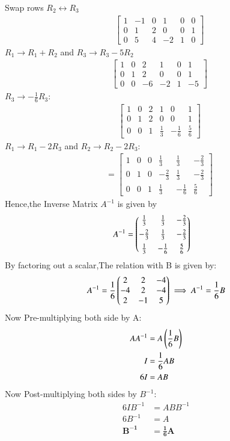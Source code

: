 \documentclass[article]{IEEEtran}
\begin{document}
	Swap rows $R_2 \leftrightarrow R_3$
	\begin{align}
		&\left[ \begin{array}{ccc|ccc} 1 & -1 & 0 & 1 & 0 & 0 \\ 0 & 1 & 2 & 0 & 0 & 1 \\ 0 & 5 & 4 & -2 & 1 & 0 \end{array} \right]
	\end{align}
		$R_1 \to R_1 + R_2$ and $R_3 \to R_3 - 5R_2$
	\begin{align}
&\left[ \begin{array}{ccc|ccc} 1 & 0 & 2 & 1 & 0 & 1 \\ 0 & 1 & 2 & 0 & 0 & 1 \\ 0 & 0 & -6 & -2 & 1 & -5 \end{array} \right]
	\end{align}
 $R_3 \to -\frac{1}{6}R_3$:
	\begin{align}
		&\left[ \begin{array}{ccc|ccc} 1 & 0 & 2 & 1 & 0 & 1 \\ 0 & 1 & 2 & 0 & 0 & 1 \\ 0 & 0 & 1 & \frac{1}{3} & -\frac{1}{6} & \frac{5}{6} \end{array} \right]
	\end{align}
$R_1 \to R_1 - 2R_3$ and $R_2 \to R_2 - 2R_3$:
	\begin{align}
		[I | A^{-1}] &= \left[ \begin{array}{ccc|ccc} 1 & 0 & 0 & \frac{1}{3} & \frac{1}{3} & -\frac{2}{3} \\ 0 & 1 & 0 & -\frac{2}{3} & \frac{1}{3} & -\frac{2}{3} \\ 0 & 0 & 1 & \frac{1}{3} & -\frac{1}{6} & \frac{5}{6} \end{array} \right]
	\end{align}
Hence,the Inverse Matrix {$A^{-1}$} is given by 
	\begin{align}
		A^{-1} &= \begin{pmatrix} \frac{1}{3} & \frac{1}{3} & -\frac{2}{3} \\[1ex] -\frac{2}{3} & \frac{1}{3} & -\frac{2}{3} \\[1ex] \frac{1}{3} & -\frac{1}{6} & \frac{5}{6} \end{pmatrix}
	\end{align}
	By factoring out a scalar,The relation with B is given by:
	\begin{align}
		A^{-1} = \frac{1}{6} \begin{pmatrix} 2 & 2 & -4 \\ -4 & 2 & -4 \\ 2 & -1 & 5\end{pmatrix}
		\implies A^{-1} = \frac{1}{6}B 
			\end{align}
Now Pre-multiplying both side by A:
	\begin{align}
		A A^{-1} &= A \left(\frac{1}{6}B\right) \\
		I &= \frac{1}{6}AB \\
		6I &= AB 
	\end{align}
Now Post-multiplying both sides by $B^{-1}$:
	\begin{align}
		6I B^{-1} &= A B B^{-1} \\
		6B^{-1} &= A \\
		\mathbf{B^{-1}} &= \mathbf{\frac{1}{6}A}
			\end{align}
	
\end{document}
